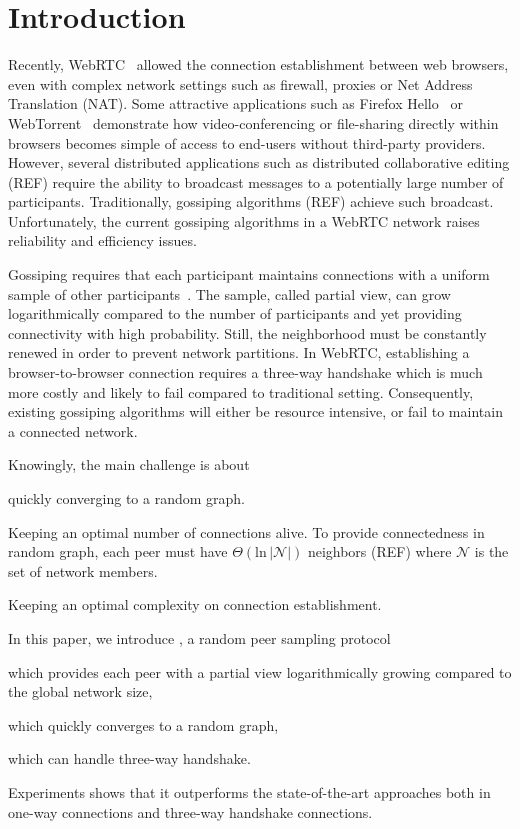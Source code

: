 
\section{Introduction}

Recently, WebRTC~\cite{webrtc} allowed the connection establishment between
web browsers, even with complex network settings such as firewall, proxies or
Net Address Translation (NAT).  Some attractive applications such as Firefox
Hello~\cite{firefoxhello} or WebTorrent~\cite{webtorrent} demonstrate how
video-conferencing or file-sharing directly within browsers becomes simple of
access to end-users without third-party providers. However, several distributed
applications such as distributed collaborative editing (REF) require the
ability to broadcast messages to a potentially large number of
participants. Traditionally, gossiping algorithms (REF) achieve such
broadcast. Unfortunately, the current gossiping algorithms in a WebRTC network
raises reliability and efficiency issues.

Gossiping requires that each participant maintains connections with a uniform
sample of other participants~\cite{jelasity2004peer}. The sample, called
partial view, can grow logarithmically compared to the number of participants
and yet providing connectivity with high probability. Still, the neighborhood
must be constantly renewed in order to prevent network partitions. In WebRTC,
establishing a browser-to-browser connection requires a three-way handshake
which is much more costly and likely to fail compared to traditional
setting. Consequently, existing gossiping algorithms will either be resource
intensive, or fail to maintain a connected network.

Knowingly, the main challenge is about
\begin{inparaenum}[(i)]
\item quickly converging to a random graph.
\item Keeping an optimal number of connections alive. To provide connectedness
  in random graph, each peer must have $\Theta(\text{ln}\, |\mathcal{N}|)$
  neighbors (REF) where $\mathcal{N}$ is the set of network members.
\item Keeping an optimal complexity on connection establishment.
\end{inparaenum}

In this paper, we introduce \SCAMPLON{}, a random peer sampling protocol
\begin{inparaenum}[(i)]
\item which provides each peer with a partial view logarithmically growing
  compared to the global network size,
\item which quickly converges to a random graph,
\item which can handle three-way handshake.
\end{inparaenum}
Experiments shows that it outperforms the state-of-the-art approaches both in
one-way connections and three-way handshake connections.


